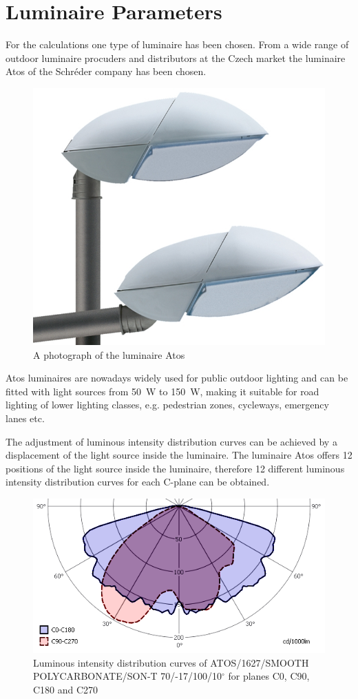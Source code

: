 \section{Luminaire Parameters}
For the calculations one type of luminaire has been chosen. From a wide range of outdoor luminaire procuders and distributors at the Czech market the luminaire Atos of the Schr\'{e}der company has been chosen.

\begin{figure}[htb]
  \centering
  \includegraphics[width=0.7\columnwidth]{Atos}
  \caption{A photograph of the luminaire Atos}
  \label{fig:Atos}
\end{figure}

Atos luminaires are nowadays widely used for public outdoor lighting and can be fitted with light sources from 50~W to 150~W, making it suitable for road lighting of lower lighting classes, e.g. pedestrian zones, cycleways, emergency lanes etc.

The adjustment of luminous intensity distribution curves can be achieved by a displacement of the light source inside the luminaire. The luminaire Atos offers 12 positions of the light source inside the luminaire, therefore 12 different luminous intensity distribution curves for each C-plane can be obtained.

\begin{figure}[htb]
  \centering
  \includegraphics[width=\columnwidth]{70W_A1_v2}
  \caption{Luminous intensity distribution curves of ATOS/1627/SMOOTH POLYCARBONATE/SON-T 70/-17/100/10$^\circ$ for planes C0, C90, C180 and C270}
  \label{fig:lumIntDistr}
\end{figure}

